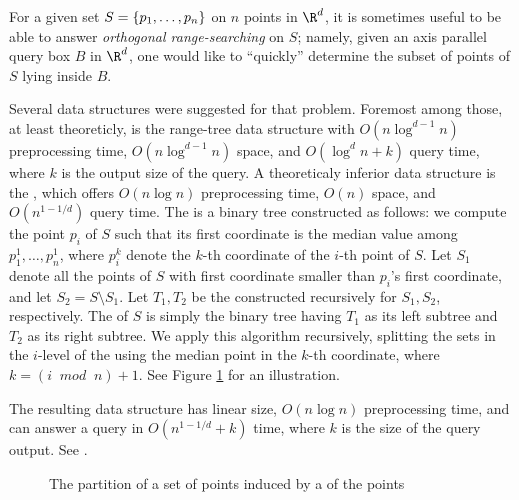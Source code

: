
For a given set $S = \left\{ { p_1, \ldots, p_n } \right\}$ on $n$ points in
$\R^d$, it is sometimes useful to be able to answer {\em orthogonal
   range-searching} on $S$; namely, given an axis parallel query box
$B$ in $\R^d$, one would like to ``quickly'' determine the subset of
points of $S$ lying inside $B$.





Several data structures were suggested for that problem. 
Foremost among those, at least theoreticly, is the range-tree data structure
with $O(n \log^{d-1} n)$ preprocessing time, $O(n\log^{d-1} n)$ space,
and $O(\log^{d} n + k)$ query time, where $k$ is the output size of
the query.
A theoreticaly inferior data structure is the \kdt, which offers $O(n
\log{n})$ preprocessing time, $O(n)$ space, and $O(n^{1-1/d})$ query
time. The {\kdt}  is a binary tree constructed as follows: we compute
the point $p_i$ of $S$ such that its first coordinate is the median
value among $p_1^1, \ldots, p_n^1$, where $p_i^k$ denote the $k$-th
coordinate of the $i$-th point of $S$. Let $S_1$ denote all the points
of $S$ with first coordinate smaller than $p_i$'s first coordinate, and
let $S_2 = S \setminus S_1$.  Let $T_1,T_2$ be the {\kdts}  constructed
recursively for $S_1, S_2$, respectively.  The {\kdt}  of $S$ is simply
the binary tree having $T_1$ as its left subtree and $T_2$ as its
right subtree. We apply this algorithm recursively, splitting the sets
in the $i$-level of the {\kdt}  using the median point in the $k$-th
coordinate, where $k=(i \;\;mod \;\;n) + 1$. See Figure
\ref{KDT_fig:kdtree} for an illustration.

The resulting data structure has linear size, $O(n\log{n})$
preprocessing time, and can answer a query in $O(n^{1-1/d} +k)$ time,
where $k$ is the size of the query output. See \cite{bkos-cgaa-97}.

\begin{ccTexOnly}

\begin{figure}[hb]
    \begin{center}
    \end{center}

    \caption{The partition of a set of  points induced by a  
       {\kdt}  of the points}

    \label{KDT_fig:kdtree}
\end{figure}

\end{ccTexOnly}

